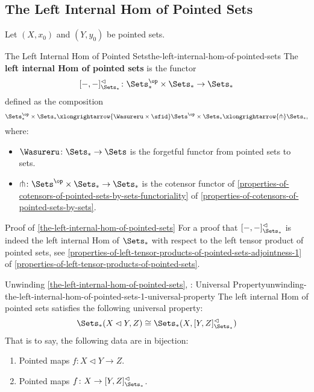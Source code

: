 \subsection{The Left Internal Hom of Pointed Sets}\label{subsection-the-left-internal-hom-of-pointed-sets}
Let $(X,x_{0})$ and $(Y,y_{0})$ be pointed sets.
\begin{definition}{The Left Internal Hom of Pointed Sets}{the-left-internal-hom-of-pointed-sets}%
    The \textbf{left internal Hom of pointed sets} is the functor%
    \[
        [-,-]^{\lhd}_{\Sets_{*}}%
        \colon%
        \Sets^{\op}_{*}\times\Sets_{*}%
        \to%
        \Sets_{*}%
    \]%
    defined as the composition
    \[
        \Sets^{\op}_{*}\times\Sets_{*}%
        \xlongrightarrow{\Wasureru\times\sfid}%
        \Sets^{\op}\times\Sets_{*}%
        \xlongrightarrow{\pitchfork}%
        \Sets_{*},%
    \]%
    where:
    \begin{itemize}
        \item $\Wasureru\colon\Sets_{*}\to\Sets$ is the forgetful functor from pointed sets to sets.
        \item $\pitchfork\colon\Sets^{\op}\times\Sets_{*}\to\Sets_{*}$ is the cotensor functor of \cref{properties-of-cotensors-of-pointed-sets-by-sets-functoriality} of \cref{properties-of-cotensors-of-pointed-sets-by-sets}.%
    \end{itemize}
\end{definition}
\begin{Proof}{Proof of \cref{the-left-internal-hom-of-pointed-sets}}%
    For a proof that $[-,-]^{\lhd}_{\Sets_{*}}$ is indeed the left internal Hom of $\Sets_{*}$ with respect to the left tensor product of pointed sets, see \cref{properties-of-left-tensor-products-of-pointed-sets-adjointness-1} of \cref{properties-of-left-tensor-products-of-pointed-sets}.
\end{Proof}
\begin{remark}{Unwinding \cref{the-left-internal-hom-of-pointed-sets}, \rmI: Universal Property}{unwinding-the-left-internal-hom-of-pointed-sets-1-universal-property}%
    The left internal Hom of pointed sets satisfies the following universal property:%
    \[%
        \Sets_{*}(X\lhd Y,Z)%
        \cong%
        \Sets_{*}(X,[Y,Z]^{\lhd}_{\Sets_{*}})%
    \]%
    That is to say, the following data are in bijection:
    \begin{enumerate}
        \item Pointed maps $f\colon X\lhd Y\to Z$.
        \item Pointed maps $f\colon X\to[Y,Z]^{\lhd}_{\Sets_{*}}$.
    \end{enumerate}
\end{remark}
